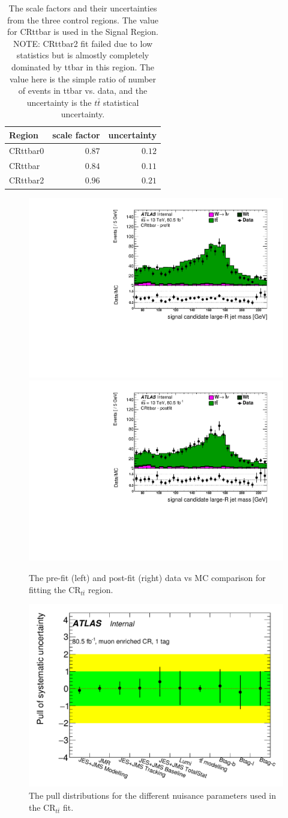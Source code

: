 \begin{table}
  \centering
  \caption{The \ttbar scale factors and their uncertainties from the three \ttbar
control regions. The value for CRttbar is used in the Signal Region. NOTE:
CRttbar2 fit failed due to low statistics but is almostly completely dominated
by ttbar in this region.  The value here is the simple ratio of number of events in ttbar
vs. data, and the uncertainty is the $t\bar{t}$ statistical uncertainty.}
  \begin{tabular}{@{}lrr@{}}
    \toprule
    Region & scale factor & uncertainty \\
    \midrule
    CRttbar0 & $0.87$ & $0.12$ \\
    CRttbar  & $0.84$ & $0.11$ \\
    CRttbar2 & $0.96$ & $0.21$ \\
    \bottomrule
  \end{tabular}
  \label{table:ttbar_kfactors}
\end{table}

\begin{figure}[!htbp]
\centering
\includegraphics[width=0.49\linewidth]{figures/backgrounds/ttbar_prefit} \hfill
\includegraphics[width=0.49\linewidth]{figures/backgrounds/ttbar_postfit}
\caption{The pre-fit (left) and post-fit (right) data vs MC comparison for fitting the $\text{CR}_{t\bar{t}}$ region.}
\label{sec:background:ttbar_fit}
\end{figure}

\begin{figure}[!htbp]
\centering
\includegraphics[width=0.7\linewidth]{figures/backgrounds/ttbar_pulls}
\caption{The pull distributions for the different nuisance parameters used in the $\text{CR}_{t\bar{t}}$ fit.}
\label{sec:background:ttbar_pulls}
\end{figure}
